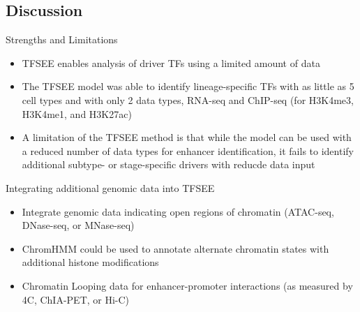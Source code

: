 \documentclass[bigger]{beamer}
\begin{document}
\subsection{Discussion}
\label{sec:org6a3c489}
\begin{frame}[label={sec:orgf7f1ed4}]{Strengths and Limitations}
\begin{itemize}
\item TFSEE enables analysis of driver TFs using a limited amount of data
\item The TFSEE model was able to identify lineage-specific TFs with as little as 5
cell types and with only 2 data types, RNA-seq and ChIP-seq (for H3K4me3,
H3K4me1, and H3K27ac)
\item A limitation of the TFSEE method is that while the model can be used with a
reduced number of data types for enhancer identification, it fails to identify
additional subtype- or stage-specific drivers with reducde data input
\end{itemize}
\end{frame}
\begin{frame}[label={sec:orga915143}]{Integrating additional genomic data into TFSEE}
\begin{itemize}
\item Integrate genomic data indicating open regions of chromatin (ATAC-seq,
DNase-seq, or MNase-seq)
\item ChromHMM could be used to annotate alternate chromatin states with additional
histone modifications
\item Chromatin Looping data for enhancer-promoter interactions (as measured by 4C,
ChIA-PET, or Hi-C)
\end{itemize}
\end{frame}
\end{document}
